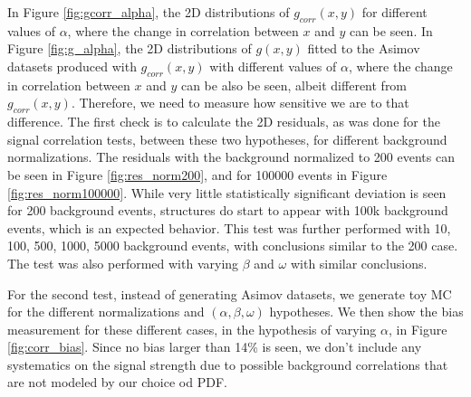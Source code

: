 In Figure \ref{fig:gcorr_alpha}, the 2D distributions of $g_{corr}(x,y)$ for different values of $\alpha$, where the change in correlation between $x$ and $y$ can be seen.  
In Figure \ref{fig:g_alpha}, the 2D distributions of $g(x,y)$ fitted to the Asimov datasets produced with  $g_{corr}(x,y)$ with different values of $\alpha$, where the change in correlation between $x$ and $y$ can be also be seen, albeit different from $g_{corr}(x,y)$. Therefore, we need to measure how sensitive we are to that difference. 
The first check is to calculate the 2D residuals, as was done for the signal correlation tests, between these two hypotheses, for different background normalizations. 
The residuals with the background normalized to 200 events can be seen in Figure \ref{fig:res_norm200}, and for 100000 events in Figure \ref{fig:res_norm100000}. 
While very little statistically significant deviation is seen for 200 background events, structures do start to appear with 100k background events, which is an expected behavior. 
This test was further performed with 10, 100, 500, 1000, 5000 background events, with conclusions similar to the 200 case. 
The test was also performed with varying $\beta$ and $\omega$ with similar conclusions. 

For the second test, instead of generating Asimov datasets, we generate toy MC for the different normalizations and $(\alpha,\beta,\omega)$ hypotheses. 
We then show the bias measurement for these different cases, in the hypothesis of varying $\alpha$, in Figure \ref{fig:corr_bias}. 
Since no bias larger than 14\% is seen, we don't include any systematics on the signal strength due to possible background correlations that are not modeled by our choice od PDF.

